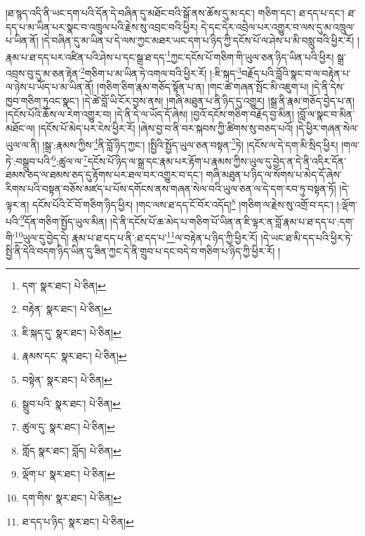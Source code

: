 །ཐ་སྙད་འདི་ནི་ཡང་དག་པའི་དོན་དེ་བཞིན་དུ་མཐོང་བའི་སྒོ་ནས་ཆོས་དུ་མ་དང་། གཅིག་དང་། ཐ་དད་པ་དང་། ཐ་དད་པ་མ་ཡིན་པར་སྣང་བ་འཁྲུལ་པའི་རྗེས་སུ་འབྲང་བའི་ཕྱིར། དེ་དང་དེར་འབྲེལ་པར་འགྱུར་བ་ལས་དུ་མ་འཁྲུལ་པ་ཡིན་ནོ། །དེ་བཞིན་དུ་མ་ཡིན་པ་དེ་ལས་ཀྱང་མཐར་ཡང་དག་པ་ཉིད་ཀྱི་དངོས་པོ་ལ་ཤེས་པ་མི་བསླུ་བའི་ཕྱིར་རོ། །རྣམ་པ་ཐ་དད་པར་འཛིན་པའི་ཤེས་པ་དང་སྒྲ་ཐ་དད་\footnote{དག་  སྣར་ཐང་།  པེ་ཅིན། }ཀྱང་དངོས་པོ་གཅིག་གི་ཡུལ་ཅན་ཉིད་ཡིན་པའི་ཕྱིར། སྒྲ་འབྲས་བུ་དུ་མ་ཅན་རྟེན་\footnote{བརྟེན་  སྣར་ཐང་།  པེ་ཅིན། }གཅིག་པ་མ་ཡིན་ཏེ་འགལ་བའི་ཕྱིར་རོ། །:ཇི་སྐད་\footnote{ཇི་སྐད་དུ་  སྣར་ཐང་།  པེ་ཅིན། }བརྗོད་པའི་བློའི་སྣང་བ་ལ་བརྟེན་པ་ལ་ཉེས་པ་ཡོད་པ་མ་ཡིན་ནོ། །གཅིག་ཅིག་རྣམ་གཅོད་སྟོན་པ་ན། །གང་ཚེ་གཞན་སྤོང་མི་འཇུག་པ། །དེ་ནི་དེས་ཁྱབ་གཅིག་ཏུའང་སྣང་། །དེ་ཚེ་བློ་ཡི་ངོར་བྱས་ནས། །གཞི་མཐུན་པ་ནི་ཉིད་དུ་འགྱུར། །སྒྲ་ནི་རྣམ་གཅོད་བྱེད་པ་ན། །དངོས་པོའི་ཆོས་ལ་རེག་འགྱུར་བ། །དེ་ནི་དེ་ལ་ཡོད་དོ་ཞེས། །བྱའོ་དངོས་གཅིག་བརྗོད་བྱ་མིན། །བློ་ལ་སྣང་བ་མིན་མཐོང་ལ། །དངོས་པོ་མེད་པར་ངེས་ཕྱིར་རོ། །ཞེས་བྱ་བ་ནི་བར་སྐབས་ཀྱི་ཚིགས་སུ་བཅད་པའོ། །དེ་ཕྱིར་གཞན་སེལ་ཡུལ་ལ་ནི། །སྒྲ་:རྣམས་ཀྱིས་\footnote{རྣམས་དང་  སྣར་ཐང་།  པེ་ཅིན། }ནི་བློ་ཉིད་ཀྱང་། །སྤྱིའི་སྤྱོད་ཡུལ་ཅན་བསྟན་\footnote{བསྟེན་  སྣར་ཐང་།  པེ་ཅིན། }ཏེ། །དངོས་ལ་དེ་དག་མི་སྲིད་ཕྱིར། །གལ་ཏེ་:བསྒྲུབ་པའི་\footnote{སྒྲུབ་པའི་  སྣར་ཐང་།  པེ་ཅིན། }:ཚུལ་ལ་\footnote{ཚུལ་དུ་  སྣར་ཐང་།  པེ་ཅིན། }དངོས་པོ་ཉིད་ལ་སྒྲ་དང་རྣམ་པར་རྟོག་པ་རྣམས་ཀྱིས་ཡུལ་དུ་བྱེད་ན་དེ་ནི་འདིར་དོན་ཐམས་ཅད་ལ་ཐམས་ཅད་དུ་རྟོགས་པར་ཐལ་བར་འགྱུར་བ་དང་། གཞི་མཐུན་པ་ཉིད་ལ་སོགས་པ་མེད་དོ་ཞེས་རིགས་པའི་བསྟན་བཅོས་མཛད་པ་པོས་དགོངས་ནས་གཞན་སེལ་བའི་ཡུལ་ཅན་ལ་དེ་དག་རབ་ཏུ་བསྟན་ཏོ། །དེ་ལྟར་ན། དངོས་པོའི་ངོ་བོ་གཅིག་ཉིད་ཕྱིར། །གང་ལས་ཐ་དད་ངོ་བོར་འདོད།\footnote{གློད  སྣར་ཐང་། བློད།  པེ་ཅིན། } །གཅིག་ལ་རྗེས་སུ་འགྲོ་བ་དང་། །:ལྡོག་པའི་\footnote{ལྡོག་པ་  སྣར་ཐང་།  པེ་ཅིན། }དོན་གཅིག་སྤྱོད་ཡུལ་མིན། །དེ་ནི་དངོས་པོ་ཆ་མེད་པ་གཅིག་པོ་ཡིན་ན་ཇི་ལྟར་ན་བློ་རྣམ་པ་ཐ་དད་པ་:དག་གི་\footnote{དག་གིས་  སྣར་ཐང་།  པེ་ཅིན། }ཡུལ་དུ་བྱེད་དེ། རྣམ་པ་ཐ་དད་པ་ནི་:ཐ་དད་པ་\footnote{ཐ་དད་པ་ཉིད་  སྣར་ཐང་།  པེ་ཅིན། }ལ་བརྟེན་པ་ཉིད་ཀྱི་ཕྱིར་རོ། །དེ་ཡང་ཐ་མི་དད་པའི་ཕྱིར་ཏེ་སྤྱི་ནི་དེའི་བདག་ཉིད་ཡིན་དུ་ཟིན་ཀྱང་དེ་ནི་གྲུབ་པ་དང་བདེ་བ་གཅིག་པ་ཉིད་ཀྱི་ཕྱིར་རོ། །

